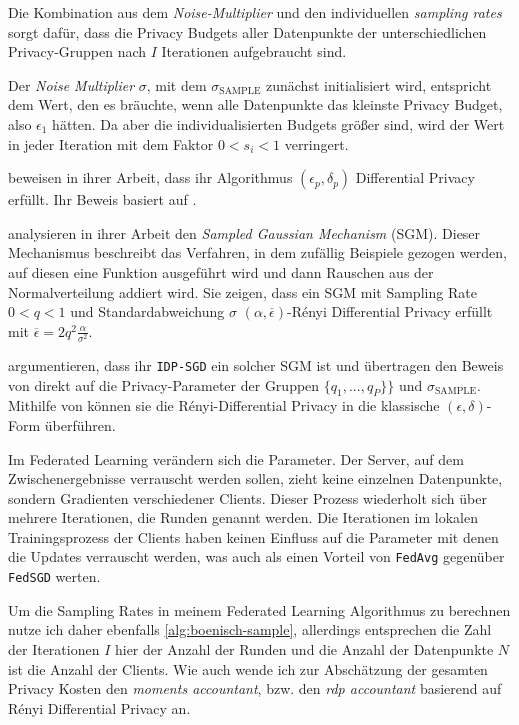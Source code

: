 Die Kombination aus dem \textit{Noise-Multiplier} und den individuellen \textit{sampling rates} sorgt dafür, dass die Privacy Budgets aller Datenpunkte der unterschiedlichen Privacy-Gruppen nach $I$ Iterationen aufgebraucht sind. 

Der \textit{Noise Multiplier} $\sigma$, mit dem $\sigma_{\text{SAMPLE}}$ zunächst initialisiert wird, entspricht dem Wert, den es bräuchte, wenn alle Datenpunkte das kleinste Privacy Budget, also $\epsilon_1$ hätten. Da aber die individualisierten Budgets größer sind, wird der Wert in jeder Iteration mit dem Faktor $0 < s_i < 1$ verringert.

\textcite[p.26f.]{boenisch:2023} beweisen in ihrer Arbeit, dass ihr Algorithmus $(\epsilon_p, \delta_p)$ Differential Privacy erfüllt. Ihr Beweis basiert auf \textcite{mironov:2017, mironov:2019}. 

\textcite{mironov:2019} analysieren in ihrer Arbeit den \textit{Sampled Gaussian Mechanism} (SGM). Dieser Mechanismus beschreibt das Verfahren, in dem zufällig Beispiele gezogen werden, auf diesen eine Funktion ausgeführt wird und dann Rauschen aus der Normalverteilung addiert wird. Sie zeigen, dass ein SGM mit Sampling Rate $0 < q < 1$ und Standardabweichung $\sigma$ $(\alpha, \overline{\epsilon})$-Rényi Differential Privacy erfüllt mit $\overline{\epsilon} = 2q^2 \frac{\alpha}{\sigma^2}$.

\citeauthor{boenisch:2023} argumentieren, dass ihr \texttt{IDP-SGD} ein solcher SGM ist und übertragen den Beweis von \citeauthor{mironov:2019} direkt auf die Privacy-Parameter der Gruppen $\{q_1, ..., q_P\}\}$ und $\sigma_{\text{SAMPLE}}$. Mithilfe von \textcite{mironov:2017} können sie die Rényi-Differential Privacy in die klassische $(\epsilon, \delta)$-Form überführen.

Im Federated Learning verändern sich die Parameter. Der Server, auf dem Zwischenergebnisse verrauscht werden sollen, zieht keine einzelnen Datenpunkte, sondern Gradienten verschiedener Clients. Dieser Prozess wiederholt sich über mehrere Iterationen, die Runden genannt werden. Die Iterationen im lokalen Trainingsprozess der Clients haben keinen Einfluss auf die Parameter mit denen die Updates verrauscht werden, was auch \textcite[p.3]{mcmahan:2018} als einen Vorteil von \texttt{FedAvg} gegenüber \texttt{FedSGD} werten. 

Um die Sampling Rates in meinem Federated Learning Algorithmus zu berechnen nutze ich daher ebenfalls \autoref{alg:boenisch-sample}, allerdings entsprechen die Zahl der Iterationen $I$ hier der Anzahl der Runden und die Anzahl der Datenpunkte $N$ ist die Anzahl der Clients. Wie auch \textcite{mcmahan:2018, boenisch:2023} wende ich zur Abschätzung der gesamten Privacy Kosten den \textit{moments accountant}, bzw. den \textit{rdp accountant} \cite{wang:2020} basierend auf Rényi Differential Privacy \cite{mironov:2017} an.

